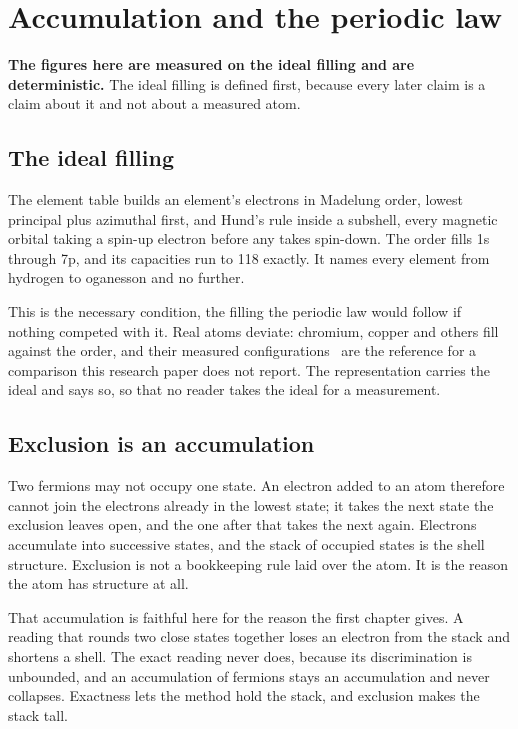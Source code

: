 \chapter{Accumulation and the periodic law}

\textbf{The figures here are measured on the ideal filling and are deterministic.} The ideal filling
is defined first, because every later claim is a claim about it and not about a measured atom.

\section{The ideal filling}

The element table builds an element's electrons in Madelung order, lowest principal plus azimuthal
first, and Hund's rule inside a subshell, every magnetic orbital taking a spin-up electron before any
takes spin-down. The order fills 1s through 7p, and its capacities run to 118 exactly. It names every
element from hydrogen to oganesson and no further.

This is the necessary condition, the filling the periodic law would follow if nothing competed with
it. Real atoms deviate: chromium, copper and others fill against the order, and their measured
configurations~\cite{src:NIST-Atomic-Spectra-Database} are the reference for a comparison this
research paper does not report. The representation carries the ideal and says so, so that no reader
takes the ideal for a measurement.

\section{Exclusion is an accumulation}

Two fermions may not occupy one state. An electron added to an atom therefore cannot join the
electrons already in the lowest state; it takes the next state the exclusion leaves open, and the one
after that takes the next again. Electrons accumulate into successive states, and the stack of
occupied states is the shell structure. Exclusion is not a bookkeeping rule laid over the atom. It is
the reason the atom has structure at all.

That accumulation is faithful here for the reason the first chapter gives. A reading that rounds two
close states together loses an electron from the stack and shortens a shell. The exact reading never
does, because its discrimination is unbounded, and an accumulation of fermions stays an accumulation
and never collapses. Exactness lets the method hold the stack, and exclusion makes the stack tall.

